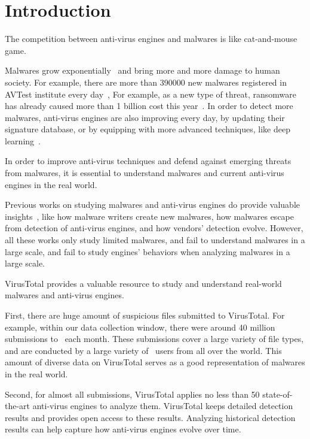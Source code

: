 \section{Introduction}
\label{sec:intro}



The competition between anti-virus engines and malwares is like cat-and-mouse game. 

Malwares grow exponentially~\cite{avtest} and bring more and more damage to human society. 
For example, there are more than 390000 new malwares registered in AVTest institute every day~\cite{avtest}, 
For example, as a new type of threat, ransomware has already caused more than 1 billion cost this year~\cite{ransomware}. 
In order to detect more malwares, anti-virus engines are also improving every day, 
by updating their signature database, 
or by equipping with more advanced techniques, like deep learning~\cite{cylance}. 

In order to improve anti-virus techniques and defend against emerging threats from malwares, 
it is essential to understand malwares and current anti-virus engines in the real world. 


Previous works on studying malwares and anti-virus engines do provide valuable 
insights~\cite{ZhouSP2012,GuptaComsnets2009, vendors-study}, like  
how malware writers create new malwares, how malwares escape from detection of anti-virus engines, 
and how vendors' detection evolve. 
However, all these works only study limited malwares, 
and fail to understand malwares in a large scale, 
and fail to study engines' behaviors when analyzing malwares in a large scale. 


VirusTotal provides a valuable resource to study and 
understand real-world malwares and anti-virus engines. 

First, there are huge amount of suspicious files submitted to VirusTotal. 
For example, within our data collection window, 
there were around 40 million submissions to \vt\ each month. 
These submissions cover a large variety of file types, and 
are conducted by a large variety of \vt\ users from all over the world. 
This amount of diverse data on VirusTotal serves as a good representation of malwares in the real world.  

Second, for almost all submissions, 
VirusTotal applies no less than 50 state-of-the-art anti-virus engines to analyze them. 
VirusTotal keeps detailed detection results and provides open access to these results. 
Analyzing historical detection results can help capture how anti-virus engines evolve over time. 

